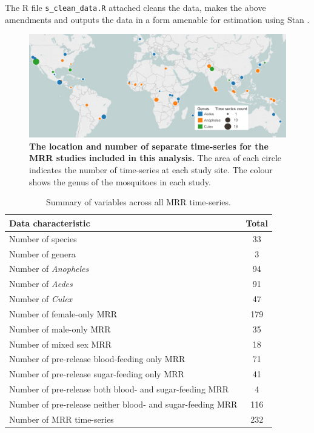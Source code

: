 \documentclass[12pt]{article}
\begin{document}
The R file \verb|s_clean_data.R| attached cleans the data, makes the above amendments and outputs the data in a form amenable for estimation using Stan \citep{carpenter2016stan}.

\begin{figure}[h]
	\centerline{\includegraphics[width=1.25\textwidth]{./Figure_files/mrr_mapGenusCropped.pdf}}
	\caption{\textbf{The location and number of separate time-series for the MRR studies included in this analysis.} The area of each circle indicates the number of time-series at each study site. The colour shows the genus of the mosquitoes in each study.}
	\label{fig:mrr_lifetimes_map}
\end{figure}


\begin{table}[htbp]
	\centering
	\begin{tabular}{lc}
		\toprule
		\textbf{Data characteristic} & \textbf{Total} \\
		\midrule
		Number of species & 33 \\
		Number of genera & 3 \\
		Number of \textit{Anopheles} & 94 \\
		Number of \textit{Aedes} & 91 \\
		Number of \textit{Culex} & 47 \\
		Number of female-only MRR & 179 \\
		Number of male-only MRR & 35 \\
		Number of mixed sex MRR & 18 \\
		Number of pre-release blood-feeding only MRR & 71 \\
		Number of pre-release sugar-feeding only MRR & 41 \\
		Number of pre-release both blood- and sugar-feeding MRR & 4 \\
		Number of pre-release neither blood- and sugar-feeding MRR & 116 \\
		Number of MRR time-series & 232 \\
		\bottomrule
	\end{tabular}%
	\caption{Summary of variables across all MRR time-series.}
	\label{tab:mrr_aggregateData}%
\end{table}%
\end{document}
